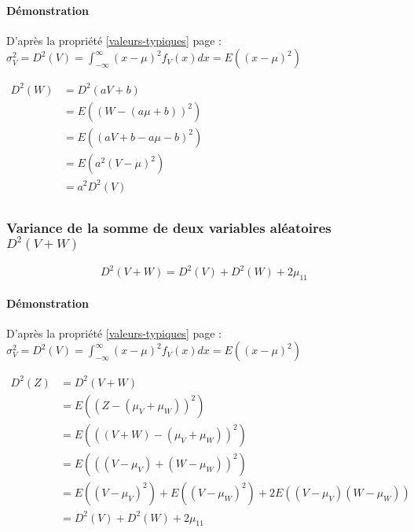 \paragraph{Démonstration}
D'après la propriété \ref{valeurs-typiques} page \pageref{valeurs-typiques} : $\displaystyle\sigma_V^2 = D^2(V) = \int_{-\infty}^\infty (x-\mu)^2 f_V(x)dx = E\left((x-\mu)^2\right)$
\begin{center}
$\begin{array}{LL}
D^2(W) &= D^2(aV+b)\\
       &= E\left((W-(a\mu+b))^2\right)\\
       &= E\left((aV+b-a\mu-b)^2\right)\\
       &= E\left(a^2(V-\mu)^2\right)\\
       &= a^2D^2(V)\\
\end{array}$
\end{center}






\subsubsection{Variance de la somme de deux variables aléatoires $D^2(V+W)$}
\label{distribution-somme-variance}
$$\boxed{D^2(V+W) = D^2(V)+D^2(W)+2\mu_{11}}$$
\paragraph{Démonstration}
D'après la propriété \ref{valeurs-typiques} page \pageref{valeurs-typiques} : $\displaystyle\sigma_V^2 = D^2(V) = \int_{-\infty}^\infty (x-\mu)^2 f_V(x)dx = E\left((x-\mu)^2\right)$
\begin{center}
$\begin{array}{LL}
D^2(Z) &= D^2(V+W)\\
       &= E\left((Z-(\mu_V+\mu_W))^2\right)\\
       &= E\left(((V+W)-(\mu_V+\mu_W))^2\right)\\
       &= E\left(((V-\mu_V)+(W-\mu_W))^2\right)\\
       &= E\left((V-\mu_V)^2\right) + E\left((V-\mu_W)^2\right) + 2E\left((V-\mu_V)(W-\mu_W)\right)\\
       &= D^2(V)+D^2(W)+2\mu_{11}\\
\end{array}$
\end{center}
